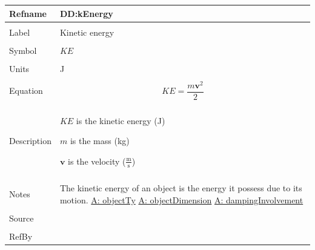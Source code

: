 \documentclass[12pt]{article}
\begin{document}
\noindent \begin{minipage}{\textwidth}
\begin{tabular}{p{} p{}}
\toprule \textbf{Refname} & \textbf{DD:kEnergy}
\label{DD:kEnergy}
\\ \midrule \\
Label & Kinetic energy
        \\ \midrule \\
        Symbol & $KE$
                 \\ \midrule \\
                 Units & J
                         \\ \midrule \\
                         Equation & \begin{displaymath}
                                    KE=\frac{m \mathbf{v}^{2}}{2}
                                    \end{displaymath}
                                    \\ \midrule \\
                                    Description & \begin{symbDescription}
                                                  \item{$KE$ is the kinetic energy (J)}
                                                  \item{$m$ is the mass (kg)}
                                                  \item{$\mathbf{v}$ is the velocity ($\frac{\text{m}}{\text{s}}$)}
                                                  \end{symbDescription}
                                                  \\ \midrule \\
                                                  Notes & The kinetic energy of an object is the energy it possess due to its motion.
                                                          \hyperref[assumpOT]{A: objectTy}
                                                          \hyperref[assumpOD]{A: objectDimension}
                                                          \hyperref[assumpDI]{A: dampingInvolvement}
                                                          \\ \midrule \\
                                                          Source & \\ \midrule \\
                                                                   RefBy & 
\\ \bottomrule \end{tabular}
\end{minipage}
\par~
\end{document}
